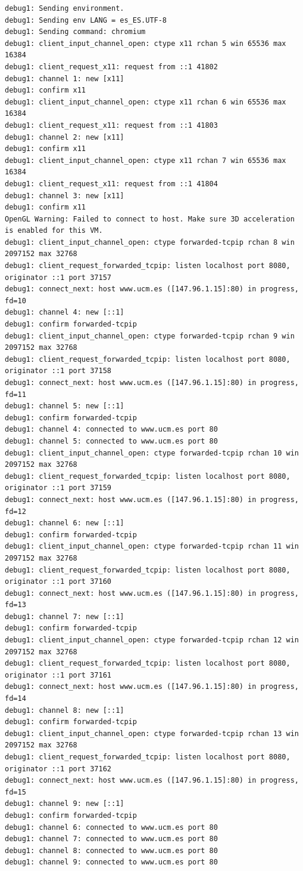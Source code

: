 \documentclass[11pt]{article}
\begin{document}
\begin{lstlisting}
debug1: Sending environment.
debug1: Sending env LANG = es_ES.UTF-8
debug1: Sending command: chromium
debug1: client_input_channel_open: ctype x11 rchan 5 win 65536 max 16384
debug1: client_request_x11: request from ::1 41802
debug1: channel 1: new [x11]
debug1: confirm x11
debug1: client_input_channel_open: ctype x11 rchan 6 win 65536 max 16384
debug1: client_request_x11: request from ::1 41803
debug1: channel 2: new [x11]
debug1: confirm x11
debug1: client_input_channel_open: ctype x11 rchan 7 win 65536 max 16384
debug1: client_request_x11: request from ::1 41804
debug1: channel 3: new [x11]
debug1: confirm x11
OpenGL Warning: Failed to connect to host. Make sure 3D acceleration is enabled for this VM.
debug1: client_input_channel_open: ctype forwarded-tcpip rchan 8 win 2097152 max 32768
debug1: client_request_forwarded_tcpip: listen localhost port 8080, originator ::1 port 37157
debug1: connect_next: host www.ucm.es ([147.96.1.15]:80) in progress, fd=10
debug1: channel 4: new [::1]
debug1: confirm forwarded-tcpip
debug1: client_input_channel_open: ctype forwarded-tcpip rchan 9 win 2097152 max 32768
debug1: client_request_forwarded_tcpip: listen localhost port 8080, originator ::1 port 37158
debug1: connect_next: host www.ucm.es ([147.96.1.15]:80) in progress, fd=11
debug1: channel 5: new [::1]
debug1: confirm forwarded-tcpip
debug1: channel 4: connected to www.ucm.es port 80
debug1: channel 5: connected to www.ucm.es port 80
debug1: client_input_channel_open: ctype forwarded-tcpip rchan 10 win 2097152 max 32768
debug1: client_request_forwarded_tcpip: listen localhost port 8080, originator ::1 port 37159
debug1: connect_next: host www.ucm.es ([147.96.1.15]:80) in progress, fd=12
debug1: channel 6: new [::1]
debug1: confirm forwarded-tcpip
debug1: client_input_channel_open: ctype forwarded-tcpip rchan 11 win 2097152 max 32768
debug1: client_request_forwarded_tcpip: listen localhost port 8080, originator ::1 port 37160
debug1: connect_next: host www.ucm.es ([147.96.1.15]:80) in progress, fd=13
debug1: channel 7: new [::1]
debug1: confirm forwarded-tcpip
debug1: client_input_channel_open: ctype forwarded-tcpip rchan 12 win 2097152 max 32768
debug1: client_request_forwarded_tcpip: listen localhost port 8080, originator ::1 port 37161
debug1: connect_next: host www.ucm.es ([147.96.1.15]:80) in progress, fd=14
debug1: channel 8: new [::1]
debug1: confirm forwarded-tcpip
debug1: client_input_channel_open: ctype forwarded-tcpip rchan 13 win 2097152 max 32768
debug1: client_request_forwarded_tcpip: listen localhost port 8080, originator ::1 port 37162
debug1: connect_next: host www.ucm.es ([147.96.1.15]:80) in progress, fd=15
debug1: channel 9: new [::1]
debug1: confirm forwarded-tcpip
debug1: channel 6: connected to www.ucm.es port 80
debug1: channel 7: connected to www.ucm.es port 80
debug1: channel 8: connected to www.ucm.es port 80
debug1: channel 9: connected to www.ucm.es port 80
\end{lstlisting}
\end{document}
